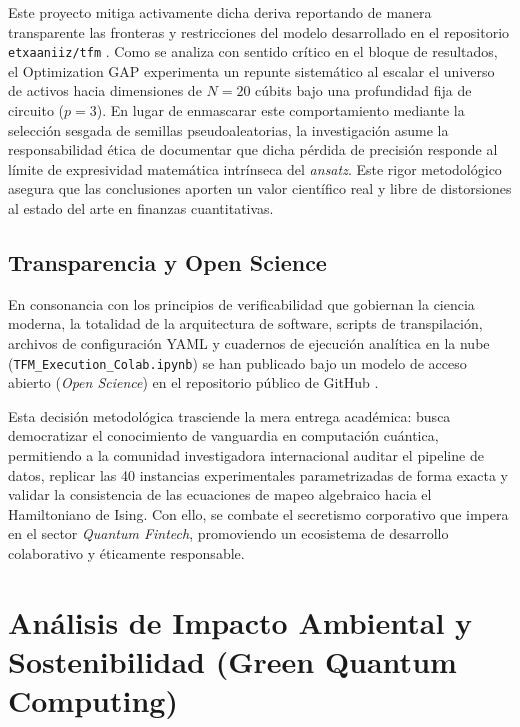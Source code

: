 Este proyecto mitiga activamente dicha deriva reportando de manera transparente las fronteras y restricciones del modelo desarrollado en el repositorio \texttt{etxaaniiz/tfm} \cite{Etxaaniiz2026}. Como se analiza con sentido crítico en el bloque de resultados, el Optimization GAP experimenta un repunte sistemático al escalar el universo de activos hacia dimensiones de $N=20$ cúbits bajo una profundidad fija de circuito ($p=3$). En lugar de enmascarar este comportamiento mediante la selección sesgada de semillas pseudoaleatorias, la investigación asume la responsabilidad ética de documentar que dicha pérdida de precisión responde al límite de expresividad matemática intrínseca del \textit{ansatz}. Este rigor metodológico asegura que las conclusiones aporten un valor científico real y libre de distorsiones al estado del arte en finanzas cuantitativas.

\subsection{Transparencia y Open Science}
En consonancia con los principios de verificabilidad que gobiernan la ciencia moderna, la totalidad de la arquitectura de software, scripts de transpilación, archivos de configuración YAML y cuadernos de ejecución analítica en la nube (\texttt{TFM\_Execution\_Colab.ipynb}) se han publicado bajo un modelo de acceso abierto (\textit{Open Science}) en el repositorio público de GitHub \cite{Etxaaniiz2026}. 

Esta decisión metodológica trasciende la mera entrega académica: busca democratizar el conocimiento de vanguardia en computación cuántica, permitiendo a la comunidad investigadora internacional auditar el pipeline de datos, replicar las 40 instancias experimentales parametrizadas de forma exacta y validar la consistencia de las ecuaciones de mapeo algebraico hacia el Hamiltoniano de Ising. Con ello, se combate el secretismo corporativo que impera en el sector \textit{Quantum Fintech}, promoviendo un ecosistema de desarrollo colaborativo y éticamente responsable.

\section{Análisis de Impacto Ambiental y Sostenibilidad (Green Quantum Computing)}
\label{sec:impacto_ambiental_green}

